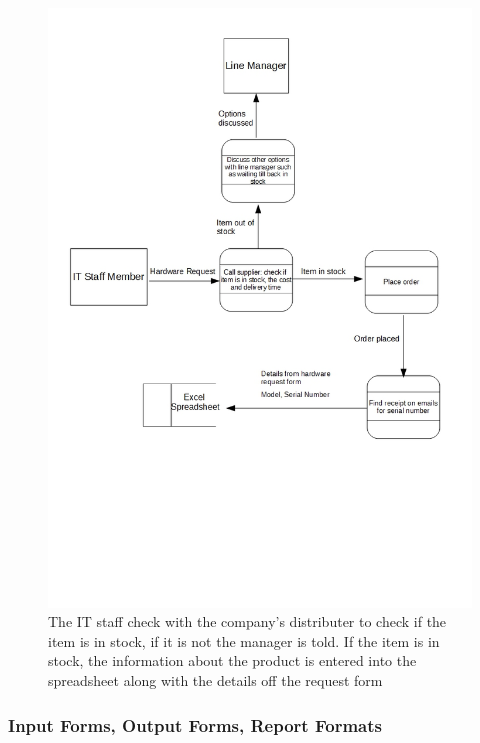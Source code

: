 \begin{figure}[H]
\includegraphics[width=\textwidth]{dataflowdiagram3.jpg}
\caption{The IT staff check with the company's distributer to check if the item is in stock, if it is not the manager is told. If the item is in stock, the information about the product is entered into the spreadsheet along with the details off the request form} \label{Page1Interview}
\end{figure}

\subsubsection{Input Forms, Output Forms, Report Formats}

